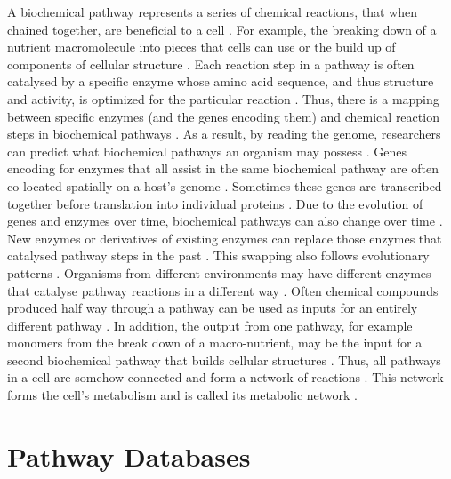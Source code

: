 A biochemical pathway represents a series of chemical reactions, that when chained together, are beneficial to a cell \cite{michal2012biochemical}. For example, the breaking down of a nutrient macromolecule into pieces that cells can use or the build up of components of cellular structure \cite{wagner2012metabolic}. Each reaction step in a pathway is often \cite{keller2015widespread,tawfik2010enzyme} catalysed by a specific enzyme whose amino acid sequence, and thus structure and activity, is optimized for the particular reaction \cite{michal2012biochemical,zhang2003evolution,fersht1999structure}. Thus, there is a mapping between specific enzymes (and the genes encoding them) and chemical reaction steps in biochemical pathways \cite{thiele2010protocol}. As a result, by reading the genome, researchers can predict what biochemical pathways an organism may possess \cite{abubucker2012metabolic,thiele2010protocol}. Genes encoding for enzymes that all assist in the same biochemical pathway are often co-located spatially on a host's genome \cite{lawrence1999selfish,de2010genomic}. Sometimes these genes are transcribed together before translation into individual proteins \cite{blumenthal1998gene,danchin1980coordinate}. Due to the evolution of genes and enzymes over time, biochemical pathways can also change over time \cite{hochachka2002biochemical,raymond2006effect}. New enzymes or derivatives of existing enzymes can replace those enzymes that catalysed pathway steps in the past \cite{jensen1976enzyme}. This swapping also follows evolutionary patterns \cite{morowitz1999theory, raymond2006effect,wagner2012metabolic}. Organisms from different environments may have different enzymes that catalyse pathway reactions in a different way \cite{raymond2006effect}. Often chemical compounds produced half way through a pathway can be used as inputs for an entirely different pathway \cite{wagner2012metabolic,stelling2002metabolic}. In addition, the output from one pathway, for example monomers from the break down of a macro-nutrient, may be the input for a second biochemical pathway that builds cellular structures \cite{wagner2012metabolic,stelling2002metabolic}. Thus, all pathways in a cell are somehow connected and form a network of reactions \cite{wagner2012metabolic,stelling2002metabolic}. This network forms the cell's metabolism and is called its metabolic network \cite{wagner2012metabolic}.

\section{Pathway Databases}

